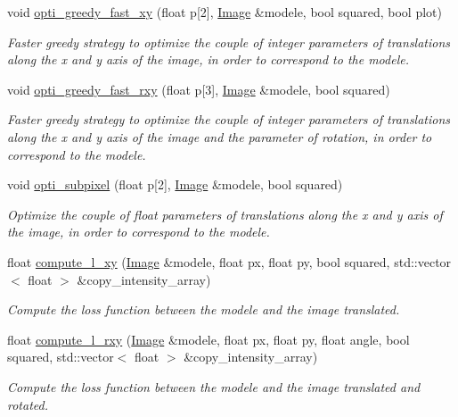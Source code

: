 \begin{DoxyCompactItemize}
void \hyperlink{class_image_afc10861bfe4de599a064fd89b521c1f5}{opti\+\_\+greedy\+\_\+fast\+\_\+xy} (float p\mbox{[}2\mbox{]}, \hyperlink{class_image}{Image} \&modele, bool squared, bool plot)
\begin{DoxyCompactList}\small\item\em Faster greedy strategy to optimize the couple of integer parameters of translations along the x and y axis of the image, in order to correspond to the modele. \end{DoxyCompactList}\item 
void \hyperlink{class_image_a90bbd736c4544675793ccec24406c56b}{opti\+\_\+greedy\+\_\+fast\+\_\+rxy} (float p\mbox{[}3\mbox{]}, \hyperlink{class_image}{Image} \&modele, bool squared)
\begin{DoxyCompactList}\small\item\em Faster greedy strategy to optimize the couple of integer parameters of translations along the x and y axis of the image and the parameter of rotation, in order to correspond to the modele. \end{DoxyCompactList}\item 
void \hyperlink{class_image_a0ee02279d63183fcc4222f47bd49b1d2}{opti\+\_\+subpixel} (float p\mbox{[}2\mbox{]}, \hyperlink{class_image}{Image} \&modele, bool squared)
\begin{DoxyCompactList}\small\item\em Optimize the couple of float parameters of translations along the x and y axis of the image, in order to correspond to the modele. \end{DoxyCompactList}\item 
float \hyperlink{class_image_a9a3520176760ee55dfd4ce22f7d1290f}{compute\+\_\+l\+\_\+xy} (\hyperlink{class_image}{Image} \&modele, float px, float py, bool squared, std\+::vector$<$ float $>$ \&copy\+\_\+intensity\+\_\+array)
\begin{DoxyCompactList}\small\item\em Compute the loss function between the modele and the image translated. \end{DoxyCompactList}\item 
float \hyperlink{class_image_aa78a6f93d0f09b8f9691398533049215}{compute\+\_\+l\+\_\+rxy} (\hyperlink{class_image}{Image} \&modele, float px, float py, float angle, bool squared, std\+::vector$<$ float $>$ \&copy\+\_\+intensity\+\_\+array)
\begin{DoxyCompactList}\small\item\em Compute the loss function between the modele and the image translated and rotated. \end{DoxyCompactList}\item 

\end{DoxyCompactItemize}
